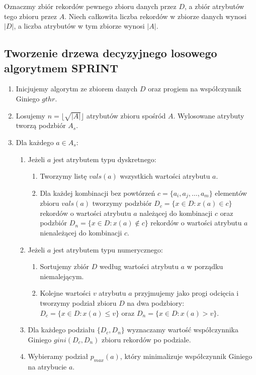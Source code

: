 \documentclass{article}
\begin{document}
Oznaczmy zbiór rekordów pewnego zbioru danych przez $D$, a zbiór atrybutów tego zbioru przez $A$. Niech całkowita liczba rekordów w zbiorze danych wynosi $\left|D\right|$, a liczba atrybutów w tym zbiorze wynosi $\left|A\right|$. 

\subsection{Tworzenie drzewa decyzyjnego losowego algorytmem SPRINT}
\begin{enumerate}
	\item Inicjujemy algorytm ze zbiorem danych $D$ oraz progiem na współczynnik Giniego $gthr$. 
	\item Losujemy $n = \lfloor\sqrt{\left|A\right|}\rfloor$ atrybutów zbioru spośród $A$. Wylosowane atrybuty tworzą podzbiór $A_s$. 
	\item Dla każdego $a \in A_s$:
	\begin{enumerate}
		\item Jeżeli $a$ jest atrybutem typu dyskretnego:
		\begin{enumerate}
			\item Tworzymy listę $vals(a)$ wszystkich wartości atrybutu $a$. 
			\item Dla każdej kombinacji bez powtórzeń $c = \{ a_i, a_j, \ldots, a_m \}$ elementów zbioru $vals(a)$ tworzymy podzbiór $D_c = \{ x \in D: x(a) \in c \}$ rekordów o wartości atrybutu $a$ należącej do kombinacji $c$ oraz podzbiór $D_n = \{ x \in D: x(a) \notin c \}$ rekordów o wartości atrybutu $a$ nienależącej do kombinacji $c$. 
		\end{enumerate}
		\item Jeżeli $a$ jest atrybutem typu numerycznego:
		\begin{enumerate}
			\item Sortujemy zbiór $D$ według wartości atrybutu $a$ w porządku niemalejącym. 
			\item Kolejne wartości $v$ atrybutu $a$ przyjmujemy jako progi odcięcia i tworzymy podział zbioru $D$ na dwa podzbiory: $D_c = \{ x \in D: x(a) \le v \}$ oraz $D_n = \{ x \in D: x(a) > v \}$. 
		\end{enumerate}
		\item Dla każdego podziału $\{D_c, D_n\}$ wyznaczamy wartość współczynnika Giniego $gini(D_c, D_n)$ zbioru rekordów po podziale. 
		\item Wybieramy podział $p_{max}(a)$, który minimalizuje współczynnik Giniego na atrybucie $a$. 
	\end{enumerate}

\end{enumerate}
\end{document}
